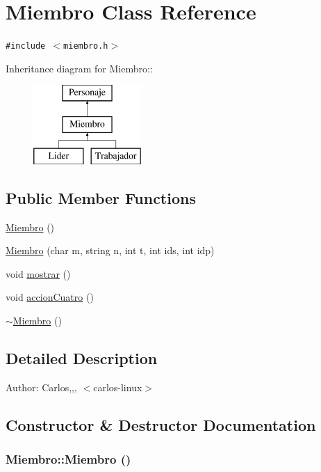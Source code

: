 \hypertarget{classMiembro}{
\section{Miembro Class Reference}
\label{classMiembro}
}
{\tt \#include $<$miembro.h$>$}

Inheritance diagram for Miembro::\begin{figure}[H]
\begin{center}
\leavevmode
\includegraphics[height=3cm]{classMiembro}
\end{center}
\end{figure}
\subsection*{Public Member Functions}
\begin{CompactItemize}
\item 
\hyperlink{classMiembro_d5ad341737a1f4631694393c99204d91}{Miembro} ()
\item 
\hyperlink{classMiembro_d90b29c63638e16aa8f83f978cb7ec47}{Miembro} (char m, string n, int t, int ids, int idp)
\item 
void \hyperlink{classMiembro_28498c7229e81e64d0cb7ea69515dca0}{mostrar} ()
\item 
void \hyperlink{classMiembro_b286484cab275d7754c6ce2b513fdc9a}{accionCuatro} ()
\item 
\hyperlink{classMiembro_d8af12663ae1b9a195d05b4f700726c3}{$\sim$Miembro} ()
\end{CompactItemize}


\subsection{Detailed Description}
\begin{Desc}
\item[Author:]Carlos,,, $<$carlos-linux$>$ \end{Desc}


\subsection{Constructor \& Destructor Documentation}
\hypertarget{classMiembro_d5ad341737a1f4631694393c99204d91}{
\subsubsection[Miembro]{\setlength{\rightskip}{0pt plus 5cm}Miembro::Miembro ()}}
\label{classMiembro_d5ad341737a1f4631694393c99204d91}


